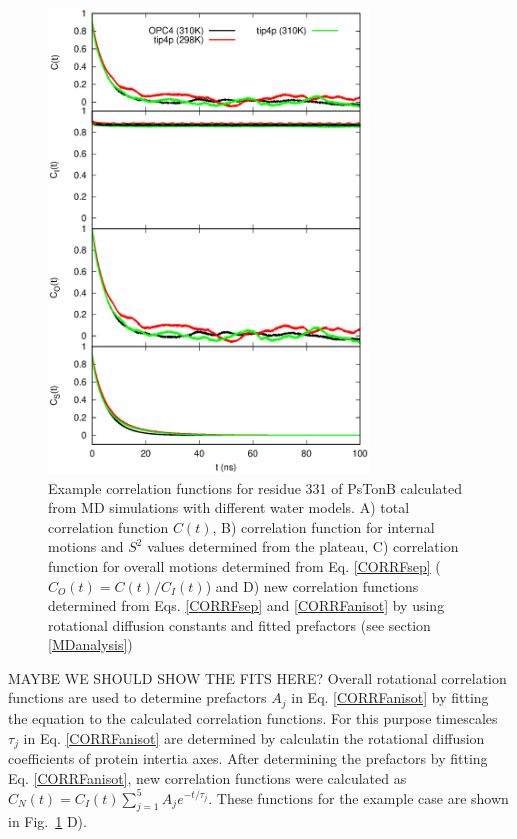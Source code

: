 \documentclass[pre,aps,floatfix,authordate1-4,twocolumn]{revtex4-1}
\begin{document}
\begin{figure}[!h]
  \includegraphics[width=8.5cm]{../Figs/exampleCORRF.eps}%
  \caption{Example correlation functions for residue 331 of PsTonB calculated from MD simulations with different water models.
    A) total correlation function $C(t)$,
    B) correlation function for internal motions and $S^2$ values determined from the plateau,
    C) correlation function for overall motions determined from Eq. \ref{CORRFsep} ($C_O(t)=C(t)/C_I(t)$) and
    D) new correlation functions determined from Eqs. \ref{CORRFsep} and \ref{CORRFanisot} by
    using rotational diffusion constants and fitted prefactors (see section \ref{MDanalysis})
    }\label{exampleCORRF}
\end{figure}

MAYBE WE SHOULD SHOW THE FITS HERE?
Overall rotational correlation functions are used to determine prefactors $A_j$ in Eq. \ref{CORRFanisot}
by fitting the equation to the calculated correlation functions. For this purpose timescales $\tau_j$
in Eq. \ref{CORRFanisot} are determined by calculatin the rotational diffusion coefficients of
protein intertia axes. 
After determining the prefactors by fitting Eq. \ref{CORRFanisot}, new correlation functions
were calculated as $C_N(t)=C_I(t)\sum_{j=1}^5 A_j e^{-t/\tau_j}$. These functions for the example
case are shown in Fig.~\ref{exampleCORRF} D).
\end{document}
